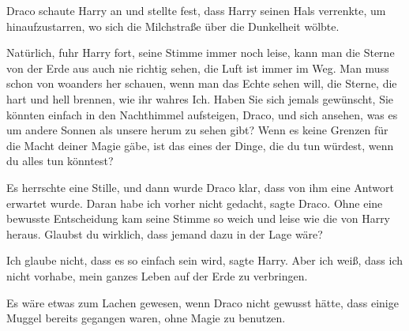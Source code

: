 Draco schaute Harry an und stellte fest, dass Harry seinen Hals verrenkte, um
hinaufzustarren, wo sich die Milchstraße über die Dunkelheit wölbte.

\glqq{}Natürlich\grqq{}, fuhr Harry fort, seine Stimme immer noch leise, \glqq{}
kann man die Sterne von der Erde aus auch nie richtig sehen, die Luft ist immer
im Weg. Man muss schon von woanders her schauen, wenn man das Echte sehen will,
die Sterne, die hart und hell brennen, wie ihr wahres Ich. Haben Sie sich jemals
gewünscht, Sie könnten einfach in den Nachthimmel aufsteigen, Draco, und sich
ansehen, was es um andere Sonnen als unsere herum zu sehen gibt? Wenn es keine
Grenzen für die Macht deiner Magie gäbe, ist das eines der Dinge, die du tun
würdest, wenn du alles tun könntest?\grqq{}

Es herrschte eine Stille, und dann wurde Draco klar, dass von ihm eine Antwort
erwartet wurde. \glqq{}Daran habe ich vorher nicht gedacht\grqq{}, sagte Draco.
Ohne eine bewusste Entscheidung kam seine Stimme so weich und leise wie die von
Harry heraus. \glqq{}Glaubst du wirklich, dass jemand dazu in der Lage
wäre?\grqq{}

\glqq{}Ich glaube nicht, dass es so einfach sein wird\grqq{}, sagte Harry. \glqq{}
Aber ich weiß, dass ich nicht vorhabe, mein ganzes Leben auf der Erde zu
verbringen.\grqq{}

Es wäre etwas zum Lachen gewesen, wenn Draco nicht gewusst hätte, dass einige
Muggel bereits gegangen waren, ohne Magie zu benutzen.

